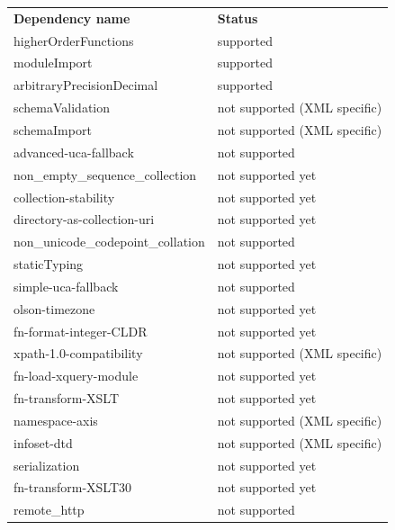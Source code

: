 \begin{table}[]
	\begin{tabular}{ll}
		\textbf{Dependency name}           & \textbf{Status}              \\
		higherOrderFunctions               & supported                    \\
		moduleImport                       & supported                    \\
		arbitraryPrecisionDecimal          & supported                    \\
		schemaValidation                   & not supported (XML specific) \\
		schemaImport                       & not supported (XML specific) \\
		advanced-uca-fallback              & not supported                \\
		non\_empty\_sequence\_collection   & not supported yet            \\
		collection-stability               & not supported yet            \\
		directory-as-collection-uri        & not supported yet            \\
		non\_unicode\_codepoint\_collation & not supported                \\
		staticTyping                       & not supported yet            \\
		simple-uca-fallback                & not supported                \\
		olson-timezone                     & not supported yet            \\
		fn-format-integer-CLDR             & not supported yet            \\
		xpath-1.0-compatibility            & not supported (XML specific) \\
		fn-load-xquery-module              & not supported yet            \\
		fn-transform-XSLT                  & not supported yet            \\
		namespace-axis                     & not supported (XML specific) \\
		infoset-dtd                        & not supported (XML specific) \\
		serialization                      & not supported yet            \\
		fn-transform-XSLT30                & not supported yet            \\
		remote\_http                       & not supported                \\

\end{tabular}
\end{table}
